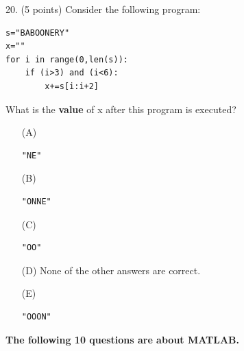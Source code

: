 \documentclass{article}
\newcounter{question}
\begin{document}
\noindent
\begin{minipage}{\textwidth}
20. (5 points)
Consider the following program:
\begin{verbatim}
s="BABOONERY"
x=""
for i in range(0,len(s)):
    if (i>3) and (i<6):
        x+=s[i:i+2]
\end{verbatim}
What is the \textbf{value} of x after this program is executed?

\begin{enumerate}
\item[(A)]
\begin{verbatim}"NE"\end{verbatim}

\item[(B)]
\begin{verbatim}"ONNE"\end{verbatim}

\item[(C)]
\begin{verbatim}"OO"\end{verbatim}

\item[(D)]
None of the other answers are correct.

\item[(E)]
\begin{verbatim}"OOON"\end{verbatim}

\end{enumerate}
\end{minipage}
\vspace{10em}
\filbreak\vfil{}\vfilneg


\pagebreak  \noindent \textbf{The following 10 questions are about MATLAB.}
\\\\

\end{document}
